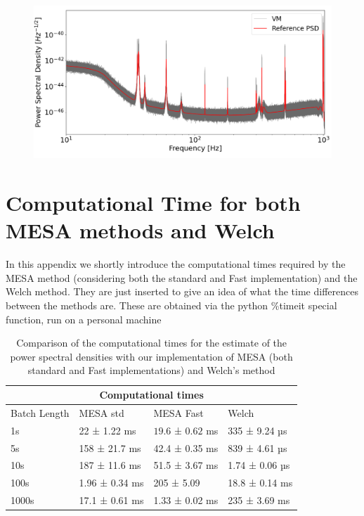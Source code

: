 \documentclass[epj,nopacs]{svjour}
\begin{document}
\begin{appendix}
\begin{figure}[H]
	\label{fig:allVM}
	\includegraphics[width=\linewidth,keepaspectratio]{Images/Plots/ALL_VMs}
\end{figure}

\section{Computational Time for both MESA methods and Welch}\label{sec:computationaltimes}
In this appendix we shortly introduce the computational times required by the MESA method (considering both the standard and Fast implementation) and the Welch method. They are just inserted to give an idea of what the time differences between the methods are. These are obtained via the python \%timeit special function, run on a personal machine 
\begin{table}[H]
\begin{tabular}{ |p{1.5cm}||p{2cm}|p{2cm}|p{2cm}|  }
 \hline
 \multicolumn{4}{|c|}{Computational times} \\
 \hline
 Batch Length& MESA std &MESA Fast&Welch\\

 \hline
 1s   &  22  ± 1.22 ms   &$19.6$ ± $0.62$ ms &  335 ± 9.24 µs\\
 5s &   158  ± 21.7 ms   & 42.4 ± 0.35 ms   &839 ± 4.61 µs \\
 10s & 187  ± 11.6 ms & 51.5 ± 3.67 ms&  1.74  ± 0.06 µs \\
 100s    & 1.96 ± 0.34 ms  &205  ± 5.09 &  18.8 ± 0.14 ms\\
 1000s&  17.1  ± 0.61 ms  &1.33  ± 0.02 ms &235 ± 3.69 ms\\

 \hline
\end{tabular}
\caption{Comparison of the computational times for the estimate of the power spectral densities with our implementation of MESA (both standard and Fast implementations) and Welch's method}
\label{tb1:ComputationalTimes}
\end{table}


\end{appendix}
\end{document}

